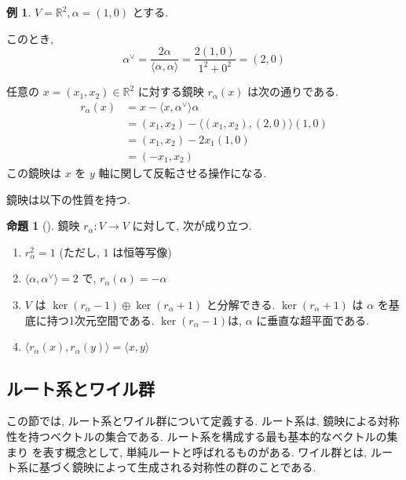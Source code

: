 \documentclass[
  a4paper, 
  12pt,
  ja=standard,
  xelatex,
  left=30truemm,
  right=30truemm,
  titlepage 
]{bxjsarticle}
\theoremstyle{definition}
\newtheorem{prop}[thm]{命題}
\newtheorem*{ex}{例}
\begin{document}
\begin{ex}
  $V = \mathbb{R}^2, \alpha = (1, 0)$ とする.
  
  このとき, 
  \[
  \alpha^{\vee} = \frac{2 \alpha}{\langle \alpha, \alpha \rangle} = \frac{2 (1, 0)}{1^2 + 0^2} = (2, 0)
  \]

  任意の $x = (x_1, x_2) \in \mathbb{R}^2$ に対する鏡映 $r_\alpha(x)$ は次の通りである.
  \[
  \begin{aligned}
    r_\alpha(x) &= x - \langle x, \alpha^{\vee} \rangle \alpha \\
    &= (x_1, x_2) - \langle (x_1, x_2), (2, 0) \rangle (1, 0) \\
    &= (x_1, x_2) - 2x_1 (1, 0) \\
    &= (-x_1, x_2)
  \end{aligned}
  \]
  この鏡映は $x$ を $y$ 軸に関して反転させる操作になる.
\end{ex}

鏡映は以下の性質を持つ.

\begin{prop}[{\cite[5章2節命題2, 5章3節]{b3}}] 
  鏡映 $r_\alpha: V \to V $ に対して, 次が成り立つ. 
  \begin{enumerate} 
    \item $r_\alpha^2 = 1$ \quad (ただし, $1$ は恒等写像)
    \item $ \langle \alpha, \alpha^{\vee} \rangle = 2 $ で, $r_\alpha(\alpha) = - \alpha$
    \item $V$ は $ \ker(r_\alpha - 1) \oplus \ker(r_\alpha + 1)$ と分解できる. $\ker(r_\alpha + 1)$ は $\alpha$ を基底に持つ1次元空間である. 
    $\ker(r_\alpha - 1) $は, $\alpha$ に垂直な超平面である. 
    \item $\langle r_\alpha(x), r_\alpha(y) \rangle = \langle x, y \rangle $
  \end{enumerate}
\end{prop}

\subsection{ルート系とワイル群}
  この節では, ルート系とワイル群について定義する. ルート系は, 鏡映による対称性を持つベクトルの集合である. ルート系を構成する最も基本的なベクトルの集まり
  を表す概念として, 単純ルートと呼ばれるものがある. ワイル群とは, ルート系に基づく鏡映によって生成される対称性の群のことである.
\bigskip
\end{document}
